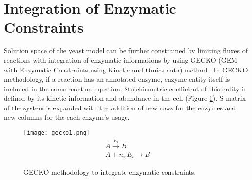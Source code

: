 \section{Integration of Enzymatic Constraints}

Solution space of the yeast model can be further constrained by limiting fluxes of reactions with integration of enzymatic informations by using GECKO (GEM with Enzymatic Constraints using Kinetic and Omics data) method \cite{sanchez2017improving}.  In GECKO methodology, if a reaction has an annotated enzyme, enzyme entity itself is included in the same reaction equation. Stoichiometric coefficient of this entity is defined by its kinetic information and abundance in the cell (Figure \ref{fig:gecko1}). S matrix of the system is expanded with the addition of new rows for the enzymes and new columns for the each enzyme's usage.

\begin{figure}[H]
\begin{center}
\texttt{[image: gecko1.png]}
\begin{align}
\label{eq:geckoreaction}
 \ A \xrightarrow{E_i} B \\
 \label{eq:gecko}
 \ A + n_{ij}E_i \xrightarrow{} B
\end{align}
\end{center}
\caption[GECKO methodology to integrate enzymatic constraints]{GECKO methodology to integrate enzymatic constraints.}
\label{fig:gecko1}
\end{figure}

